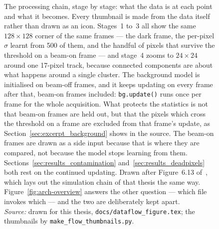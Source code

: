\documentclass[a4paper,headsepline,oneside,11pt]{scrartcl}
\newcommand{\figsource}[1]{\\[3pt]{\footnotesize\emph{Source:} #1}}
\begin{document}
\begin{figure}[htbp]
  \centering
  \resizebox{\textwidth}{!}{\qbDataFlow}
  \caption{The processing chain, stage by stage: what the data is at each point
  and what it becomes. Every thumbnail is made from the data itself rather than
  drawn as an icon. Stages~1 to~3 all show the same $128\times128$ corner of the
  same frames --- the dark frame, the per-pixel $\sigma$ learnt from 500 of them,
  and the handful of pixels that survive the threshold on a beam-on frame ---
  and stage~4 zooms to $24\times24$ around one 17-pixel track, because connected
  components are about what happens around a single cluster. The background model is
  initialised on beam-off frames, and it keeps updating on every frame after
  that, beam-on frames included: \texttt{bg.update()} runs once per frame for
  the whole acquisition. What protects the statistics is not that beam-on frames
  are held out, but that the pixels which cross the threshold on a frame are
  excluded from that frame's update, as
  Section~\ref{sec:excerpt_background} shows in the source. The beam-on frames
  are drawn as a side input because that is where they are compared, not because
  the model stops learning from them. Sections~\ref{sec:results_contamination}
  and~\ref{sec:results_deadpixels} both rest on the continued updating. Drawn after Figure~6.13 of~\cite{Filter2018},
  which lays out the simulation chain of that thesis the same way.
  Figure~\ref{fig:arch-overview} answers the other question --- which file
  invokes which --- and the two are deliberately kept apart.\figsource{drawn for this thesis, \texttt{docs/dataflow\_figure.tex}; the thumbnails by \texttt{make\_flow\_thumbnails.py}.}}
  \label{fig:dataflow}
\end{figure}
\end{document}
